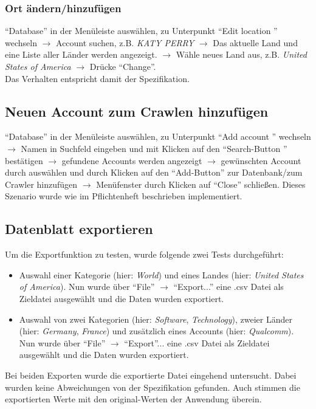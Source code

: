 \subsubsection{Ort ändern/hinzufügen}
"`Database"' in der Menüleiste auswählen, zu Unterpunkt "`Edit location "' wechseln $\to$ Account suchen, z.B. \textit{KATY PERRY} $\to$ Das aktuelle Land und eine Liste aller Länder werden angezeigt. $\to$ Wähle neues Land aus, z.B. \textit{United States of America} $\to$ Drücke "`Change"'.\\
Das Verhalten entspricht damit der Spezifikation.

\subsection{Neuen Account zum Crawlen hinzufügen} \label{sec:AddNewAccount}
"`Database"' in der Menüleiste auswählen, zu Unterpunkt "`Add account "' wechseln $\to$ Namen in Suchfeld eingeben und mit Klicken auf den "`Search-Button "' bestätigen $\to $ gefundene Accounts werden angezeigt $\to$ gewünschten Account durch auswählen und durch Klicken auf den "`Add-Button"' zur Datenbank/zum Crawler hinzufügen $\to$ Menüfenster durch Klicken auf "`Close"' schließen.
Dieses Szenario wurde wie im Pflichtenheft beschrieben implementiert.

\subsection{Datenblatt exportieren}
Um die Exportfunktion zu testen, wurde folgende zwei Tests durchgeführt:
\begin{itemize}
	\item Auswahl einer Kategorie (hier: \textit{World}) und eines Landes (hier: \textit{United States of America}). Nun wurde über "`File"' $\to$ "`Export..."' eine .csv Datei als Zieldatei ausgewählt und die Daten wurden exportiert.
	\item Auswahl von zwei Kategorien (hier: \textit{Software}, \textit{Technology}), zweier Länder (hier: \textit{Germany}, \textit{France}) und zusätzlich eines Accounts (hier: \textit{Qualcomm}). Nun wurde über "`File"' $\to$ "`Export"'... eine .csv Datei als Zieldatei ausgewählt und die Daten wurden exportiert.
\end{itemize}
Bei beiden Exporten wurde die exportierte Datei eingehend untersucht. Dabei wurden keine Abweichungen von der Spezifikation gefunden. Auch stimmen die exportierten Werte mit den original-Werten der Anwendung überein.




